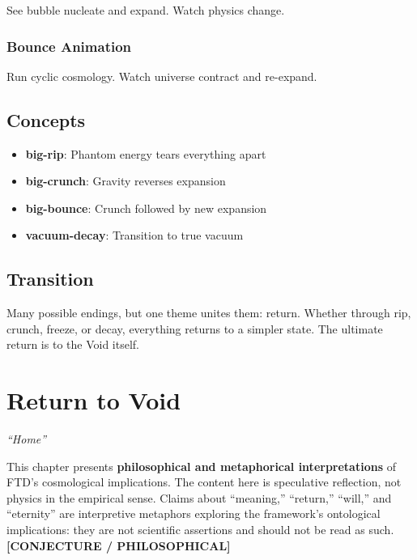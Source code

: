 \documentclass[
  11pt,
  letterpaper,
  twoside,
  openright]{book}
\providecommand{\tightlist}{%
  \setlength{\itemsep}{0pt}\setlength{\parskip}{0pt}}
\begin{document}
See bubble nucleate and expand. Watch physics change.

\subsection{Bounce Animation}\label{bounce-animation}

Run cyclic cosmology. Watch universe contract and re-expand.

\section{Concepts}\label{concepts-43}

\begin{itemize}
\tightlist
\item
  \textbf{big-rip}: Phantom energy tears everything apart
\item
  \textbf{big-crunch}: Gravity reverses expansion
\item
  \textbf{big-bounce}: Crunch followed by new expansion
\item
  \textbf{vacuum-decay}: Transition to true vacuum
\end{itemize}

\section{Transition}\label{transition-44}

Many possible endings, but one theme unites them: return. Whether
through rip, crunch, freeze, or decay, everything returns to a simpler
state. The ultimate return is to the Void itself.

\chapter{Return to Void}\label{sec-return-to-void}

\emph{``Home''}

\begin{tcolorbox}[enhanced jigsaw, leftrule=.75mm, title=\textcolor{quarto-callout-warning-color}{\faExclamationTriangle}\hspace{0.5em}{Philosophical Reflection: Not Physics}, bottomrule=.15mm, opacityback=0, coltitle=black, arc=.35mm, colframe=quarto-callout-warning-color-frame, colbacktitle=quarto-callout-warning-color!10!white, colback=white, titlerule=0mm, breakable, bottomtitle=1mm, toptitle=1mm, rightrule=.15mm, toprule=.15mm, left=2mm, opacitybacktitle=0.6]

This chapter presents \textbf{philosophical and metaphorical
interpretations} of FTD's cosmological implications. The content here is
speculative reflection, not physics in the empirical sense. Claims about
``meaning,'' ``return,'' ``will,'' and ``eternity'' are interpretive
metaphors exploring the framework's ontological implications: they are
not scientific assertions and should not be read as such.
\textbf{{[}CONJECTURE / PHILOSOPHICAL{]}}

\end{tcolorbox}
\end{document}
